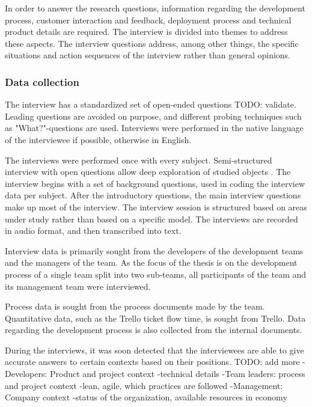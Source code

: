 \documentclass[english]{tktltiki2}
\theoremstyle{definition}
\theoremstyle{remark}
\begin{document}
In order to answer the research questions, information regarding the development process, customer interaction and feedback, deployment process and technical product details are required. The interview is divided into themes to address these aspects. The interview questions address, among other things, the specific situations and action sequences of the interview rather than general opinions. 

\subsubsection{Data collection}
The interview has a standardized set of open-ended questions TODO: validate. Leading questions are avoided on purpose, and different probing techniques such as "What?"-questions are used.    
Interviews were performed in the native language of the interviewee if possible, otherwise in English.

The interviews were performed once with every subject. Semi-structured interview with open questions allow deep exploration of studied objects \cite{runeson2009guidelines}. The interview begins with a set of background questions, used in coding the interview data per subject. After the introductory questions, the main interview questions make up most of the interview. The interview session is structured based on areas under study rather than based on a specific model. The interviews are recorded in audio format, and then transcribed into text.   

Interview data is primarily sought from the developers of the development teams and the managers of the team. As the focus of the thesis is on the development process of a single team split into two sub-teams, all participants of the team and its management team were interviewed. 

Process data is sought from the process documents made by the team. Quantitative data, such as the Trello ticket flow time, is sought from Trello. Data regarding the development process is also collected from the internal documents.

During the interviews, it was soon detected that the interviewees are able to give accurate answers to certain contexts based on their positions. TODO: add more
-Developers: Product and project context
   -technical details
-Team leaders: process and project context
   -lean, agile, which practices are followed
-Management: Company context
   -status of the organization, available resources in economy
\end{document}
